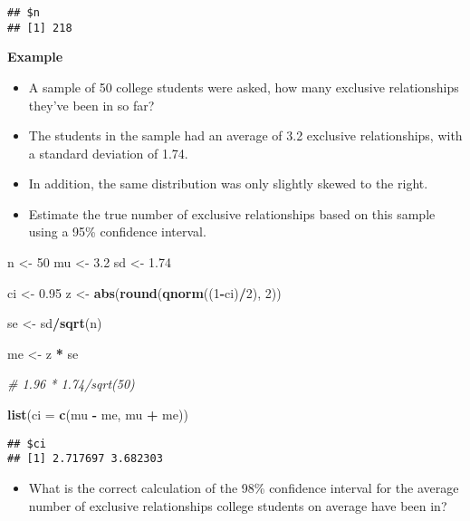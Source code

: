 \documentclass[]{book}
\newenvironment{Shaded}{\begin{snugshade}}{\end{snugshade}}
\newcommand{\CommentTok}[1]{\textcolor[rgb]{0.56,0.35,0.01}{\textit{#1}}}
\newcommand{\DataTypeTok}[1]{\textcolor[rgb]{0.13,0.29,0.53}{#1}}
\newcommand{\DecValTok}[1]{\textcolor[rgb]{0.00,0.00,0.81}{#1}}
\newcommand{\FloatTok}[1]{\textcolor[rgb]{0.00,0.00,0.81}{#1}}
\newcommand{\KeywordTok}[1]{\textcolor[rgb]{0.13,0.29,0.53}{\textbf{#1}}}
\newcommand{\NormalTok}[1]{#1}
\newcommand{\OperatorTok}[1]{\textcolor[rgb]{0.81,0.36,0.00}{\textbf{#1}}}
\newcommand{\StringTok}[1]{\textcolor[rgb]{0.31,0.60,0.02}{#1}}
\providecommand{\tightlist}{%
  \setlength{\itemsep}{0pt}\setlength{\parskip}{0pt}}
\begin{document}
\begin{verbatim}
## $n
## [1] 218
\end{verbatim}

\textbf{Example}

\begin{itemize}
\item
  A sample of 50 college students were asked, how many exclusive relationships they've been in so far?
\item
  The students in the sample had an average of 3.2 exclusive relationships, with a standard deviation of 1.74.
\item
  In addition, the same distribution was only slightly skewed to the right.
\item
  Estimate the true number of exclusive relationships based on this sample using a 95\% confidence interval.
\end{itemize}

\begin{Shaded}
\begin{Highlighting}[]
\NormalTok{n <-}\StringTok{ }\DecValTok{50}  
\NormalTok{mu <-}\StringTok{ }\FloatTok{3.2}  
\NormalTok{sd <-}\StringTok{ }\FloatTok{1.74}  

\NormalTok{ci <-}\StringTok{ }\FloatTok{0.95}
\NormalTok{z <-}\StringTok{ }\KeywordTok{abs}\NormalTok{(}\KeywordTok{round}\NormalTok{(}\KeywordTok{qnorm}\NormalTok{((}\DecValTok{1}\OperatorTok{-}\NormalTok{ci)}\OperatorTok{/}\DecValTok{2}\NormalTok{), }\DecValTok{2}\NormalTok{))}

\NormalTok{se <-}\StringTok{ }\NormalTok{sd}\OperatorTok{/}\KeywordTok{sqrt}\NormalTok{(n)}

\NormalTok{me <-}\StringTok{ }\NormalTok{z }\OperatorTok{*}\StringTok{ }\NormalTok{se}

\CommentTok{# 1.96 * 1.74/sqrt(50)}

\KeywordTok{list}\NormalTok{(}\DataTypeTok{ci =} \KeywordTok{c}\NormalTok{(mu }\OperatorTok{-}\StringTok{ }\NormalTok{me, mu }\OperatorTok{+}\StringTok{ }\NormalTok{me))}
\end{Highlighting}
\end{Shaded}

\begin{verbatim}
## $ci
## [1] 2.717697 3.682303
\end{verbatim}

\begin{itemize}
\tightlist
\item
  What is the correct calculation of the 98\% confidence interval for the average number of exclusive relationships college students on average have been in?
\end{itemize}
\end{document}
